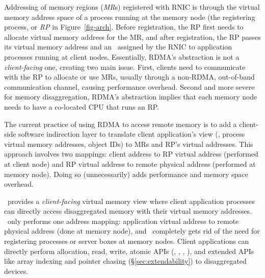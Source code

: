 Addressing of memory regions ({\em MR}s) registered with RNIC is through the virtual memory address space of a process running at the memory node
(the registering process, or {\em RP} in Figure~\ref{fig-arch}. 
Before registration, the RP first needs to allocate virtual memory address for the MR,
and after registration, the RP passes its virtual memory address and an \rkey\ assigned by the RNIC to application processes running at client nodes.
Essentially, RDMA's abstraction is not a {\em client-facing} one, creating two main issue.
First, clients need to communicate with the RP to allocate or use MRs, usually through a non-RDMA, out-of-band communication channel,
causing performance overhead.
Second and more severe for memory disaggregation, RDMA's abstraction implies that each memory node needs to have a co-located CPU that runs an RP.

The current practice of using RDMA to access remote memory is to add a client-side software indirection layer 
to translate client application's view (\eg, process virtual memory addresses, object IDs) to MRs and RP's virtual addresses.
This approach involves two mappings: client address to RP virtual address (performed at client node) and RP virtual address to remote physical address (performed at memory node).
Doing so (unnecessarily) adds performance and memory space overhead.

\sys\ provides a {\em client-facing} virtual memory view 
where client application processes can directly access disaggregated memory with their virtual memory addresses.
\sys\ only performs one address mapping: application virtual address to remote physical address (done at memory node),
and \sys\ completely gets rid of the need for registering processes or server boxes at memory nodes.
Client applications can directly perform allocation, read, write, atomic APIs (\eg, \tas, \cas, \fence), 
and extended APIs like array indexing and pointer chasing (\S\ref{sec:extendability}) to disaggregated devices.

